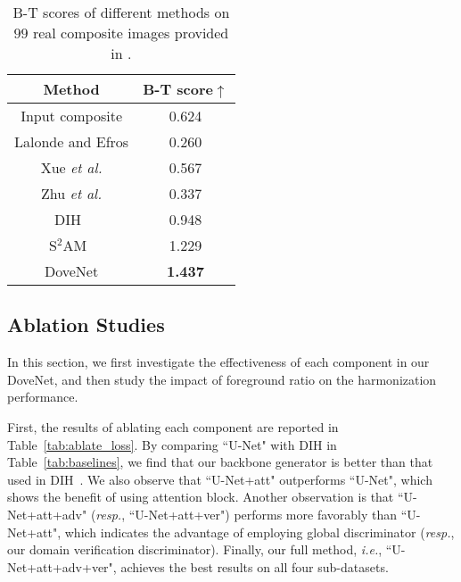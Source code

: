 \documentclass[10pt,twocolumn,letterpaper]{article}
\begin{document}
\setlength{\tabcolsep}{10pt}
\begin{table}
\centering
\begin{tabular}{|c|c|}
\hline
Method & B-T score$\uparrow$\\\hline
Input composite & 0.624 \\ \hline
Lalonde and Efros \cite{lalonde2007using} & 0.260 \\ \hline
Xue \emph{et al.} \cite{xue2012understanding} & 0.567 \\ \hline
Zhu \emph{et al.} \cite{zhu2015learning} & 0.337 \\ \hline
DIH~\cite{tsai2017deep} & 0.948 \\ \hline
S$^2$AM~\cite{xiaodong2019improving} & 1.229 \\ \hline
DoveNet & \bf1.437 \\ \hline
\end{tabular}
\caption{B-T scores of different methods on $99$ real composite images provided in \cite{tsai2017deep}. }
\vspace{-5pt}
\label{tab:BT_score}
\end{table}


\subsection{Ablation Studies}
In this section, we first investigate the effectiveness of each component in our DoveNet, and then study the impact of foreground ratio on the harmonization performance.

First, the results of ablating each component are reported in Table~\ref{tab:ablate_loss}. By comparing ``U-Net" with DIH in Table~\ref{tab:baselines}, we find that our backbone generator is better than that used in DIH~\cite{tsai2017deep}. We also observe that ``U-Net+att" outperforms ``U-Net", which shows the benefit of using attention block. Another observation is that ``U-Net+att+adv" (\emph{resp.}, ``U-Net+att+ver") performs more favorably than ``U-Net+att", which indicates the advantage of employing global discriminator (\emph{resp.}, our domain verification discriminator).
Finally, our full method, \emph{i.e.}, ``U-Net+att+adv+ver", achieves the best results on all four sub-datasets.
\end{document}
